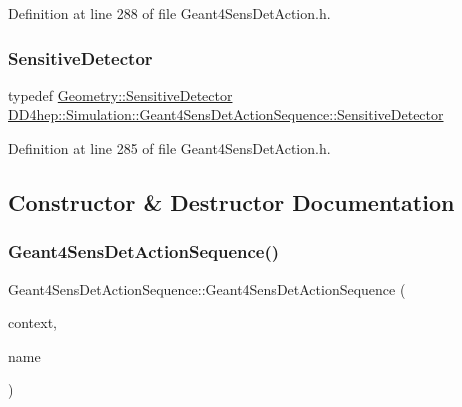 Definition at line 288 of file Geant4\+Sens\+Det\+Action.\+h.

\hypertarget{class_d_d4hep_1_1_simulation_1_1_geant4_sens_det_action_sequence_a9d428afdc7b9189bce5dab4f16db17fb}{}\label{class_d_d4hep_1_1_simulation_1_1_geant4_sens_det_action_sequence_a9d428afdc7b9189bce5dab4f16db17fb} 
\subsubsection{\texorpdfstring{Sensitive\+Detector}{SensitiveDetector}}
{\footnotesize\ttfamily typedef \hyperlink{class_d_d4hep_1_1_geometry_1_1_sensitive_detector}{Geometry\+::\+Sensitive\+Detector} \hyperlink{class_d_d4hep_1_1_simulation_1_1_geant4_sens_det_action_sequence_a9d428afdc7b9189bce5dab4f16db17fb}{D\+D4hep\+::\+Simulation\+::\+Geant4\+Sens\+Det\+Action\+Sequence\+::\+Sensitive\+Detector}}



Definition at line 285 of file Geant4\+Sens\+Det\+Action.\+h.



\subsection{Constructor \& Destructor Documentation}
\hypertarget{class_d_d4hep_1_1_simulation_1_1_geant4_sens_det_action_sequence_af8a5bb0d0ca25965a5cc7d6f9b34b469}{}\label{class_d_d4hep_1_1_simulation_1_1_geant4_sens_det_action_sequence_af8a5bb0d0ca25965a5cc7d6f9b34b469} 
\subsubsection{\texorpdfstring{Geant4\+Sens\+Det\+Action\+Sequence()}{Geant4SensDetActionSequence()}}
{\footnotesize\ttfamily Geant4\+Sens\+Det\+Action\+Sequence\+::\+Geant4\+Sens\+Det\+Action\+Sequence (\begin{DoxyParamCaption}\item[{\hyperlink{class_d_d4hep_1_1_simulation_1_1_geant4_context}{Geant4\+Context} $\ast$}]{context,  }\item[{const std\+::string \&}]{name }\end{DoxyParamCaption})}



